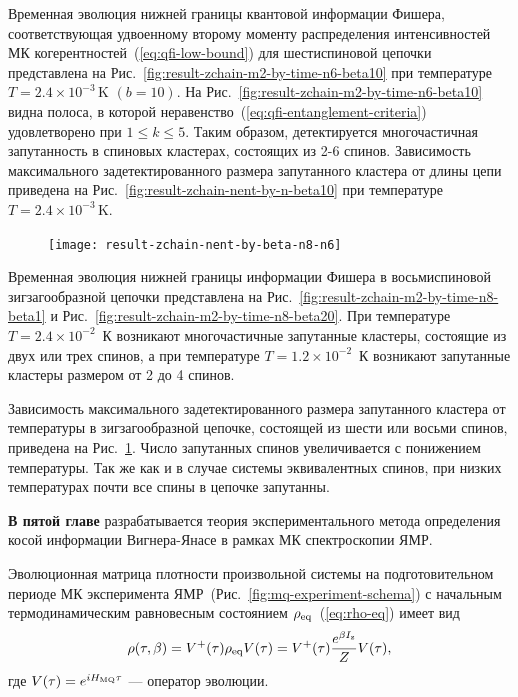 Временная эволюция нижней границы квантовой информации Фишера,
соответствующая  удвоенному второму моменту распределения интенсивностей МК когерентностей~(\ref{eq:qfi-low-bound}) для шестиспиновой цепочки представлена на Рис.~\ref{fig:result-zchain-m2-by-time-n6-beta10} при температуре $T = 2.4\times 10^{-3}\,\mbox{K}$ $(b=10)$.
На Рис.~\ref{fig:result-zchain-m2-by-time-n6-beta10} видна полоса,
в которой неравенство~(\ref{eq:qfi-entanglement-criteria}) удовлетворено при $1\leqslant k \leqslant 5$.
Таким образом, детектируется многочастичная запутанность в спиновых кластерах, состоящих из 2-6 спинов.
Зависимость максимального задетектированного размера запутанного кластера от длины цепи приведена на Рис.~\ref{fig:result-zchain-nent-by-n-beta10} при температуре $T = 2.4\times 10^{-3}\,\mbox{K}$.

\begin{figure}
  \centering
  \texttt{[image: result-zchain-nent-by-beta-n8-n6]}
  \caption{\protect}
  \label{fig:result-zchain-nent-by-beta-n8-n6}
\end{figure}

Временная эволюция нижней границы информации Фишера в восьмиспиновой зигзагообразной цепочки представлена на Рис.~\ref{fig:result-zchain-m2-by-time-n8-beta1}
и Рис.~\ref{fig:result-zchain-m2-by-time-n8-beta20}.
При температуре $T=2.4\times 10^{-2}$~К возникают многочастичные запутанные кластеры,
состоящие из двух или трех спинов,
а при температуре $T=1.2\times 10^{-2}$~К возникают запутанные кластеры размером от 2 до 4 спинов.

Зависимость максимального задетектированного размера запутанного кластера от температуры в зигзагообразной цепочке,
состоящей из шести или восьми спинов, приведена на Рис.~\ref{fig:result-zchain-nent-by-beta-n8-n6}.
Число запутанных спинов увеличивается с понижением температуры.
Так же как и в случае системы эквивалентных спинов,
при низких температурах почти все спины в цепочке запутанны.

\textbf{В пятой главе} разрабатывается теория экспериментального метода определения косой информации Вигнера-Янасе в рамках МК спектроскопии ЯМР.

Эволюционная матрица плотности произвольной системы на
подготовительном периоде МК эксперимента ЯМР~(Рис.~\ref{fig:mq-experiment-schema})
с начальным термодинамическим равновесным состоянием $\rho_\mathrm{eq}$~(\ref{eq:rho-eq}) имеет вид
%
\begin{equation}\label{eq:rho-eval}
  \rho(\tau,\beta)
  = V^+(\tau) \rho_\mathrm{eq} V(\tau)
  = V^+(\tau) \frac{e^{\beta I_\mathrm{z}}}{Z} V(\tau),
\end{equation}
%
где $V(\tau) = e^{iH_\mathrm{MQ}\tau}$
---  оператор эволюции.


